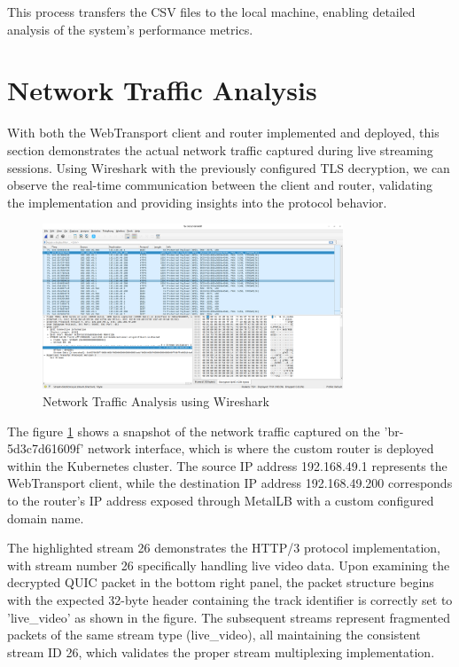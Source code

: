 This process transfers the CSV files to the local machine, enabling detailed analysis of the system’s performance metrics.




\section{Network Traffic Analysis}
With both the WebTransport client and router implemented and deployed, this section demonstrates the actual network traffic captured during live streaming sessions. Using Wireshark with the previously configured TLS decryption, we can observe the real-time communication between the client and router, validating the implementation and providing insights into the protocol behavior.
\begin{figure}[h]
    \centering
    \includegraphics[width=0.8\textwidth]{implementation/network_traffic_analysis.png}
    \caption{Network Traffic Analysis using Wireshark}
    \label{fig:network_traffic_analysis}
\end{figure}


The figure \ref{fig:network_traffic_analysis} shows a snapshot of the network traffic captured on the 'br-5d3c7d61609f' network interface, which is where the custom router is deployed within the Kubernetes cluster. The source IP address 192.168.49.1 represents the WebTransport client, while the destination IP address 192.168.49.200 corresponds to the router's IP address exposed through MetalLB with a custom configured domain name.

The highlighted stream 26 demonstrates the HTTP/3 protocol implementation, with stream number 26 specifically handling live video data. Upon examining the decrypted QUIC packet in the bottom right panel, the packet structure begins with the expected 32-byte header containing the track identifier is correctly set to 'live\_video' as shown in the figure. The subsequent streams represent fragmented packets of the same stream type (live\_video), all maintaining the consistent stream ID 26, which validates the proper stream multiplexing implementation.

